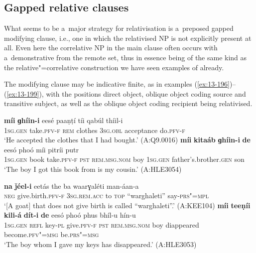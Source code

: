 \subsection{Gapped relative clauses}
\label{subsec:13-6-3}


What seems to be a~major strategy for relativisation is a~preposed gapped modifying clause, i.e., one in which the relativised NP is not explicitly present at all. Even here the correlative NP in the main clause often occurs with a~demonstrative from the remote set, thus in essence being of the same kind as the relative"=correlative construction we have seen examples of already.


The modifying clause may be indicative finite, as in examples (\ref{ex:13-196})--(\ref{ex:13-199}), with the positions direct object, oblique object coding source and transitive subject, as well as the oblique object coding recipient being relativised.

\ea
\label{ex:13-196}
\gll \textbf{míi} \textbf{ɡhíin-i} eesé paaṇṭí tíi qabúl  thíil-i \\
\textsc{1sg.gen} take.\textsc{pfv-f} \textsc{rem} clothes \textsc{3sg.obl} acceptance do.\textsc{pfv-f} \\
\glt `He accepted the clothes that I had bought.' (A:Q9.0016) 
\ex
\label{ex:13-197}
\gll \textbf{míi} \textbf{kitaáb} \textbf{ɡhíin-i} \textbf{de} eesó phoó míi pitríi putr\\
\textsc{1sg.gen} book take.\textsc{pfv-f} \textsc{pst} \textsc{rem.msg.nom} boy  \textsc{1sg.gen} father's.brother.\textsc{gen} son\\
\glt `The boy I got this book from is my cousin.' (A:HLE3054)

\ex
\label{ex:13-198}
\gll \textbf{na} \textbf{ǰéel-i} eetás the ba  waarɣaléti man-áan-a \\
\textsc{neg} give.birth.\textsc{pfv-f} \textsc{3sg.rem.acc} to \textsc{top} ``warghaleti'' say-\textsc{prs"=mpl} \\
\glt `[A goat] that does not give birth is called ``warghaleti''.' (A:KEE104) 
\ex
\label{ex:13-199}
\gll \textbf{míi} \textbf{teeṇíi} \textbf{kili-á} \textbf{dít-i} \textbf{de} eesó phoó phus bhíl-u hín-u\\
\textsc{1sg.gen} \textsc{refl} key-\textsc{pl} give.\textsc{pfv-f} \textsc{pst} \textsc{rem.msg.nom} boy diappeared become.\textsc{pfv"=msg} be.\textsc{prs"=msg}\\
\glt `The boy whom I gave my keys has disappeared.' (A:HLE3053) 
\z

